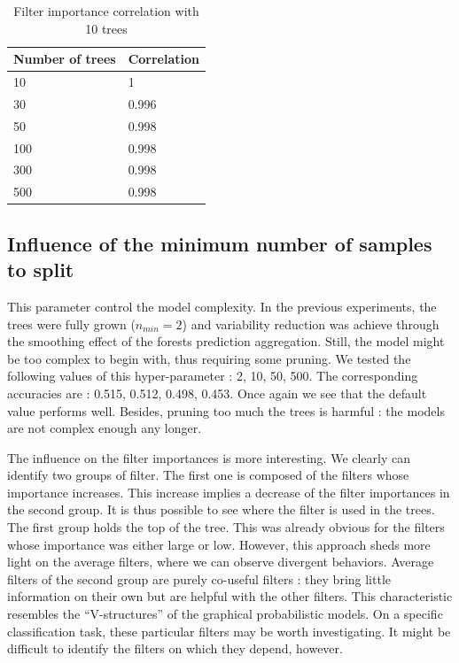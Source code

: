 \documentclass[a4paper]{report}
\newlength{\larg}
\begin{document}
		\begin{table}
			\centering
				\begin{tabular}{l|l}
				\hline
				Number of trees & Correlation \\
				\hline \hline
				10 & 1 \\
				30 & 0.996 \\
				50 & 0.998 \\
				100 & 0.998 \\
				300 & 0.998 \\
				500 & 0.998 \\
				\hline
				\end{tabular}
			\caption{\label{tab:CorrVecNbTrees}Filter importance correlation with 10 trees}
		\end{table}
		
		
		\subsection{Influence of the minimum number of samples to split}
		This parameter control the model complexity. In the previous experiments, the trees were fully grown ($n_{min} = 2$) and variability reduction was achieve through the smoothing effect of the forests prediction aggregation. Still, the model might be too complex to begin with, thus requiring some pruning. We tested the following values of this hyper-parameter : 2, 10, 50, 500. The corresponding accuracies are : 0.515, 0.512, 0.498, 0.453. Once again we see that the default value performs well. Besides, pruning too much the trees is harmful : the models are not complex enough any longer.
		\par
		The influence on the filter importances is more interesting. We clearly can identify two groups of filter. The first one is composed of the filters whose importance increases. This increase implies a decrease of the filter importances in the second group. It is thus possible to see where the filter is used in the trees. The first group holds the top of the tree. This was already obvious for the filters whose importance was either large or low. However, this approach sheds more light on the average filters, where we can observe divergent behaviors. Average filters of the second group are purely co-useful filters : they bring little information on their own but are helpful with the other filters. This characteristic resembles the ``V-structures'' of the graphical probabilistic models. On a specific classification task, these particular filters may be worth investigating. It might be difficult to identify the filters on which they depend, however.
		
\end{document}
